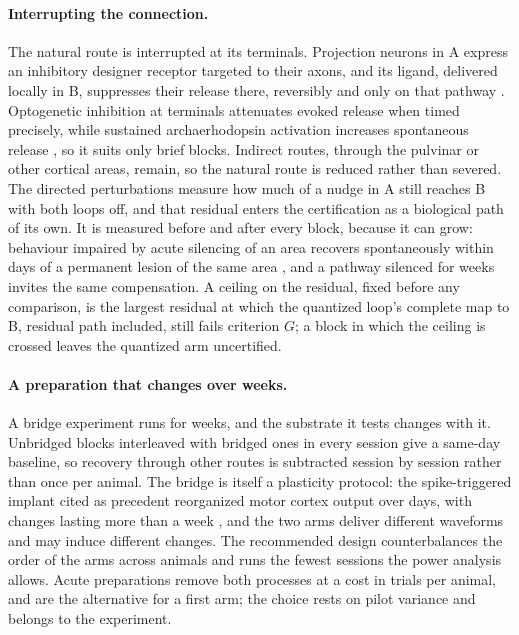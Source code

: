 \documentclass[12pt]{article}
\begin{document}
\paragraph{Interrupting the connection.} The natural route is interrupted at
its terminals. Projection neurons in A express an inhibitory designer receptor
targeted to their axons, and its ligand, delivered locally in B, suppresses
their release there, reversibly and only on that pathway \citep{stachniak2014}.
Optogenetic inhibition at terminals attenuates evoked release when timed
precisely, while sustained archaerhodopsin activation increases spontaneous
release \citep{mahn2016}, so it suits only brief blocks. Indirect routes, through
the pulvinar or other cortical areas, remain, so the natural route is reduced
rather than severed. The directed perturbations measure how much of a nudge in A
still reaches B with both loops off, and that residual enters the certification
as a biological path of its own. It is measured before and after every block,
because it can grow: behaviour impaired by acute silencing of an area recovers
spontaneously within days of a permanent lesion of the same area
\citep{otchy2015}, and a pathway silenced for weeks invites the same
compensation. A ceiling on the residual, fixed before any comparison, is the
largest residual at which the quantized loop's complete map to B, residual path
included, still fails criterion $G$; a block in which the ceiling is crossed
leaves the quantized arm uncertified.

\paragraph{A preparation that changes over weeks.} A bridge experiment runs for
weeks, and the substrate it tests changes with it. Unbridged blocks interleaved
with bridged ones in every session give a same-day baseline, so recovery
through other routes is subtracted session by session rather than once per
animal. The bridge is itself a plasticity protocol: the spike-triggered implant
cited as precedent reorganized motor cortex output over days, with changes
lasting more than a week \citep{jackson2006}, and the two arms deliver different
waveforms and may induce different changes. The recommended design
counterbalances the order of the arms across animals and runs the fewest
sessions the power analysis allows. Acute preparations remove both processes at
a cost in trials per animal, and are the alternative for a first arm; the
choice rests on pilot variance and belongs to the experiment.
\end{document}
